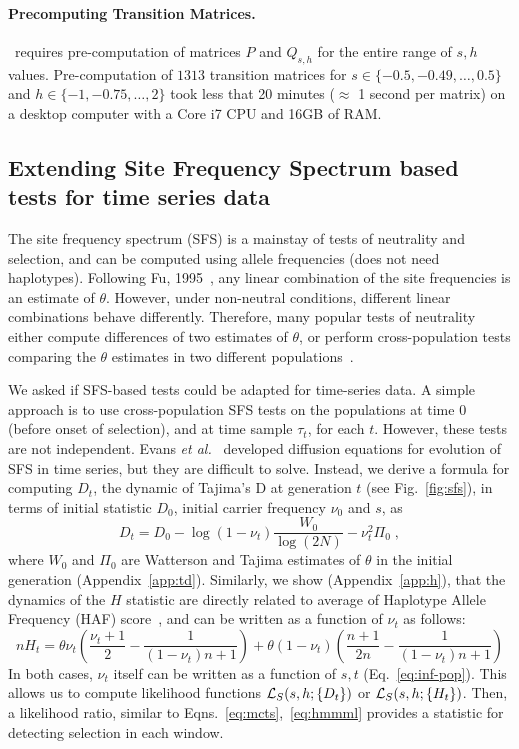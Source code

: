 \documentclass[11pt]{article}
\def\comale{\text{{\sc Comale}}}
\begin{document}
\paragraph{Precomputing Transition Matrices.}
\comale\ requires pre-computation of matrices $P$ and $Q_{s,h}$ for
the entire range of $s,h$ values. Pre-computation of $1313$ transition
matrices for $s\in\{-0.5,-0.49,\ldots,0.5 \}$ and $h\in
\{-1,-0.75,\ldots,2\}$ took less that 20 minutes ($\approx$ 1 second
per matrix) on a desktop computer with a Core i7 CPU and 16GB of RAM.


\subsection{Extending Site Frequency Spectrum  based tests for  time series 
data}\label{sec:extending-sfs}
\label{sec:sfs-ts}
The site frequency spectrum (SFS) is a mainstay of tests of neutrality
and selection, and can be computed using allele frequencies (does not
need haplotypes). Following Fu, 1995~\cite{fu1995statistical}, any
linear combination of the site frequencies is an estimate of
$\theta$. However, under non-neutral conditions, different linear
combinations behave differently. Therefore, many popular tests of
neutrality either compute differences of two estimates of $\theta$, or
perform cross-population tests comparing the $\theta$ estimates in two
different
populations~\cite{achaz2009frequency,ronen2013learning,sabeti2007genome}. 

We asked if SFS-based tests could be adapted for time-series data. A
simple approach is to use cross-population SFS tests on the
populations at time $0$ (before onset of selection), and at time
sample $\tau_t$, for each $t$. However, these tests are not
independent. Evans \emph{et al.}~\cite{evans2007non} developed diffusion
equations for evolution of SFS in time series, but they are difficult
to solve. Instead, we derive a formula for computing $D_t$, the
dynamic of Tajima's D at generation $t$ (see Fig.~\ref{fig:sfs}), in terms of 
initial statistic
$D_0$, initial carrier frequency $\nu_0$ and $s$, as
\begin{equation}
  D_t=D_0-\log(1-\nu_t) \frac{W_0}{\log(2N)} -\nu_t^2 \Pi_0\;,
  \label{eq:tdt}    
\end{equation}
where $W_0$ and $\Pi_0$ are Watterson and Tajima estimates of $\theta$
in the initial generation (Appendix~\ref{app:td}). Similarly, we show
(Appendix~\ref{app:h}), that the dynamics of the $H$ statistic are
directly related to average of Haplotype Allele Frequency (HAF)
score~\cite{ronen2015predicting}, and can be written as a function of
$\nu_t$ as follows:
\begin{equation}
  nH_t= \theta \nu_t \left(\frac{\nu_t+1}{2} -
    \frac{1}{(1-\nu_t)n+1}\right) + \theta
  (1-\nu_t)\left(\frac{n+1}{2n}-\frac{1}{(1-\nu_t)n+1}\right)
  \label{eq:ht}
\end{equation}	
In both cases, $\nu_t$ itself can be written as a function of $s,t$
(Eq.~\ref{eq:inf-pop}). This allows us to compute likelihood functions
${\cal L}_S(s,h; \{D_t\})$ or ${\cal L}_S(s,h; \{H_t\})$. Then, a likelihood
ratio, similar to Eqns.~\ref{eq:mcts},~\ref{eq:hmmml} provides a
statistic for detecting selection in each window.
\end{document}
